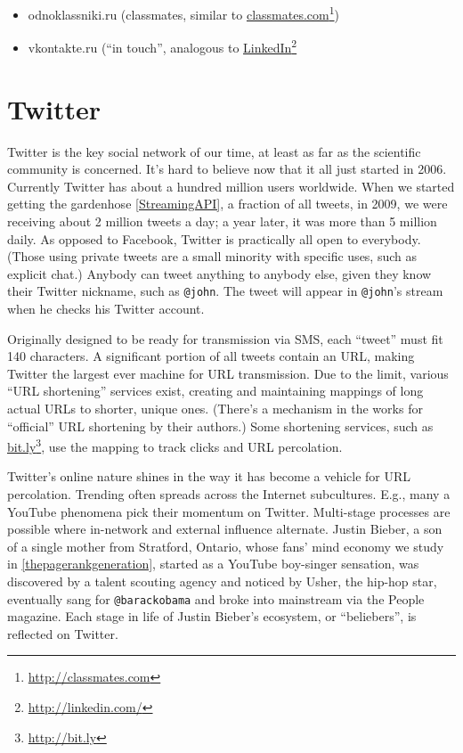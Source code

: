 \documentclass[10pt,oneside]{memoir}
\begin{document}
\begin{Spacing}{2}
\begin{itemize}


\item odnoklassniki.ru (classmates, similar to \href{http://classmates.com}{classmates.com}\footnote{\href{http://classmates.com}{http://classmates.com}})

\item vkontakte.ru (``in touch'', analogous to \href{http://linkedin.com/}{LinkedIn}\footnote{\href{http://linkedin.com/}{http://linkedin.com/}}
\end{itemize}

\pagebreak \section{Twitter}
\label{twitter}

Twitter is the key social network of our time, at least as far as the scientific community is concerned.  It's hard to believe now that it all just started in 2006.  Currently Twitter has about a hundred million users worldwide.  When we started getting the gardenhose \ref{StreamingAPI}, a fraction of all tweets, in 2009, we were receiving about 2 million tweets a day; a year later, it was more than 5 million daily.  As opposed to Facebook, Twitter is practically all open to everybody.  (Those using private tweets are a small minority with specific uses, such as explicit chat.)  Anybody can tweet anything to anybody else, given they know their Twitter nickname, such as \texttt{@john}.  The tweet will appear in \texttt{@john}'s stream when he checks his Twitter account.  


Originally designed to be ready for transmission via SMS, each ``tweet'' must fit 140 characters.  A significant portion of all tweets contain an URL, making Twitter the largest ever machine for URL transmission.  Due to the limit, various ``URL shortening'' services exist, creating and maintaining mappings of long actual URLs to shorter, unique ones.  (There's a mechanism in the works for ``official'' URL shortening by their authors.)  Some shortening services, such as \href{http://bit.ly}{bit.ly}\footnote{\href{http://bit.ly}{http://bit.ly}}, use the mapping to track clicks and URL percolation.


Twitter's online nature shines in the way it has become a vehicle for URL percolation.  Trending often spreads across the Internet subcultures.  E.g., many a YouTube phenomena pick their momentum on Twitter.  Multi-stage processes are possible where in-network and external influence alternate.  Justin Bieber, a son of a single mother from Stratford, Ontario, whose fans' mind economy we study in \ref{thepagerankgeneration}, started as a YouTube boy-singer sensation, was discovered by a talent scouting agency and noticed by Usher, the hip-hop star, eventually sang for \texttt{@barackobama}  and broke into mainstream via the People magazine.   Each stage in life of Justin Bieber's ecosystem, or ``beliebers'', is reflected on Twitter.  



\end{Spacing}
\end{document}
